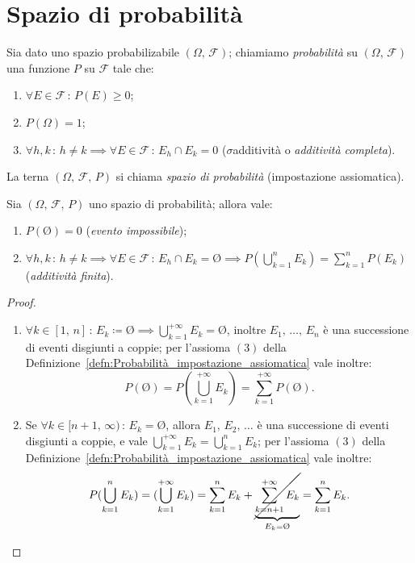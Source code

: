     \section{Spazio di probabilità}
        \begin{defn}\label{defn:Probabilità_impostazione_assiomatica}
            Sia dato uno spazio probabilizabile $(\Omega,\,\mathscr{F})$; chiamiamo \textit{probabilità} su $(\Omega,\,\mathscr{F})$ una funzione $P$ su $\mathscr{F}$ tale che:
            \begin{enumerate}
                \item $\forall E \in \mathscr{F}\,:\,P(E) \geq 0$;
                \item $P(\Omega) = 1$;
                \item $\forall h,k\,:\,h \neq k \implies \forall E \in \mathscr{F}\,:\,E_h \cap E_k = 0$ ($\sigma$\nbdash additività o \textit{additività completa}).
            \end{enumerate}
            La terna $(\Omega,\,\mathscr{F},\,P)$ si chiama \textit{spazio di probabilità} (impostazione assiomatica).
        \end{defn}
        \begin{prty}\label{prty:Spazio_di_probabilità}
            Sia $(\Omega,\,\mathscr{F},\,P)$ uno spazio di probabilità; allora vale:
            \begin{enumerate}
                \item $P(\text{\O}) = 0$ (\textit{evento impossibile});
                \item $\forall h,k\,:\,h \neq k \implies \forall E \in \mathscr{F}\,:\,E_h \cap E_k = \text{\O} \implies P(\bigcup_{k=1}^{n} E_k) = \sum_{k=1}^{n} P(E_k)$ (\textit{additività finita}).
            \end{enumerate}
        \end{prty}
        \begin{proof}
            \hfill
            \begin{enumerate}
                \item $\forall k \in [1,\,n]\,:\,E_k \coloneqq \text{\O} \implies \bigcup_{k=1}^{+\infty} E_k = \text{\O}$, inoltre $E_1,\,\ldots,\,E_n$ è una successione di eventi disgiunti a coppie; per l'assioma $(3)$ della Definizione~\ref{defn:Probabilità_impostazione_assiomatica} vale inoltre: \[
                        P\left(\text{\O}\right) = P\left(\bigcup_{k=1}^{+\infty} E_k\right) = \sum_{k=1}^{+\infty} P\left(\text{\O}\right)
                .\] 
            \item Se $\forall k \in [n+1,\,\infty)\,:\,E_k = \text{\O}$, allora $E_1,\,E_2,\,\ldots$ è una successione di eventi disgiunti a coppie, e vale $\bigcup_{k=1}^{+\infty} E_k = \bigcup_{k=1}^{n} E_k$; per l'assioma $(3)$ della Definizione~\ref{defn:Probabilità_impostazione_assiomatica} vale inoltre: \[
                    P(\bigcup_{k=1}^{n} E_k) = (\bigcup_{k=1}^{+\infty} E_k) = \sum_{k=1}^{n} E_k + \underset{E_k = \text{\O}}{\underbrace{\cancel{\sum_{k=n+1}^{+\infty} E_k}}} = \sum_{k=1}^{n} E_k
            . \qedhere\]
            \end{enumerate}
        \end{proof}
